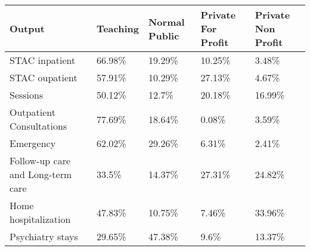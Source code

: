 \begin{tabular}{lllll}
  \toprule
Output & Teaching & Normal Public & Private For Profit & Private Non Profit \\ 
  \midrule
STAC inpatient & 66.98\% & 19.29\% & 10.25\% & 3.48\% \\ 
  STAC oupatient & 57.91\% & 10.29\% & 27.13\% & 4.67\% \\ 
  Sessions & 50.12\% & 12.7\% & 20.18\% & 16.99\% \\ 
  Outpatient Consultations & 77.69\% & 18.64\% & 0.08\% & 3.59\% \\ 
  Emergency & 62.02\% & 29.26\% & 6.31\% & 2.41\% \\ 
  Follow-up care and Long-term care & 33.5\% & 14.37\% & 27.31\% & 24.82\% \\ 
  Home hospitalization & 47.83\% & 10.75\% & 7.46\% & 33.96\% \\ 
  Psychiatry stays & 29.65\% & 47.38\% & 9.6\% & 13.37\% \\ 
   \bottomrule
\end{tabular}
